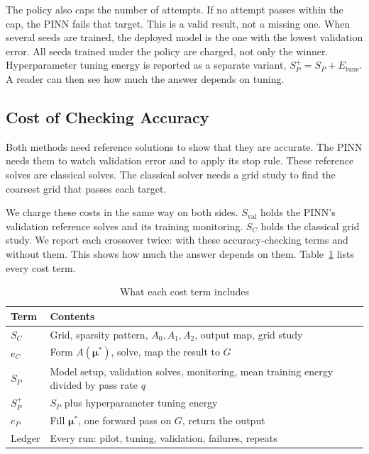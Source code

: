 \documentclass[journal]{IEEEtran}
\begin{document}
The policy also caps the number of attempts. If no attempt passes within the cap, the PINN fails that target. This is a valid result, not a missing one. When several seeds are trained, the deployed model is the one with the lowest validation error. All seeds trained under the policy are charged, not only the winner. Hyperparameter tuning energy is reported as a separate variant, $S_P^{+}=S_P+E_{\mathrm{tune}}$. A reader can then see how much the answer depends on tuning.

\subsection{Cost of Checking Accuracy}
Both methods need reference solutions to show that they are accurate. The PINN needs them to watch validation error and to apply its stop rule. These reference solves are classical solves. The classical solver needs a grid study to find the coarsest grid that passes each target.

We charge these costs in the same way on both sides. $S_{\mathrm{val}}$ holds the PINN's validation reference solves and its training monitoring. $S_C$ holds the classical grid study. We report each crossover twice: with these accuracy-checking terms and without them. This shows how much the answer depends on them. Table~\ref{tab:terms} lists every cost term.

\begin{table}[t]
\caption{What each cost term includes}
\label{tab:terms}
\centering
\footnotesize
\setlength{\tabcolsep}{3pt}
\begin{tabular}{@{}lp{6.5cm}@{}}
\toprule
Term & Contents \\
\midrule
$S_C$ & Grid, sparsity pattern, $A_0,A_1,A_2$, output map, grid study \\
$e_C$ & Form $A(\boldsymbol{\mu}^\ast)$, solve, map the result to $G$ \\
$S_P$ & Model setup, validation solves, monitoring, mean training energy divided by pass rate $q$ \\
$S_P^{+}$ & $S_P$ plus hyperparameter tuning energy \\
$e_P$ & Fill $\boldsymbol{\mu}^\ast$, one forward pass on $G$, return the output \\
Ledger & Every run: pilot, tuning, validation, failures, repeats \\
\bottomrule
\end{tabular}
\end{table}
\end{document}
